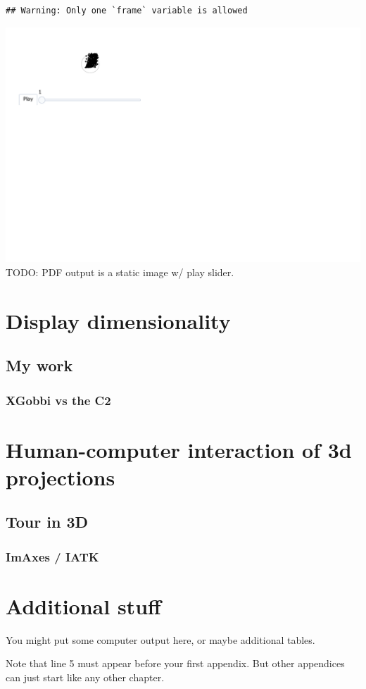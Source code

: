 \documentclass{monashthesis}
\begin{document}
\begin{verbatim}
## Warning: Only one `frame` variable is allowed
\end{verbatim}

\includegraphics{thesis_files/figure-latex/unnamed-chunk-3-1.pdf} TODO:
PDF output is a static image w/ play slider.

\chapter{Display dimensionality}\label{ch:disp_dim}

\section{My work}\label{my-work}

\subsection{XGobbi vs the C2}\label{xgobbi-vs-the-c2}

\chapter{Human-computer interaction of 3d
projections}\label{ch:hci_3dproj}

\section{Tour in 3D}\label{tour-in-3d}

\subsection{ImAxes / IATK}\label{imaxes-iatk}

\appendix

\chapter{Additional stuff}\label{additional-stuff}

You might put some computer output here, or maybe additional tables.

Note that line 5 must appear before your first appendix. But other
appendices can just start like any other chapter.

\printbibliography[heading=bibintoc]
\end{document}
